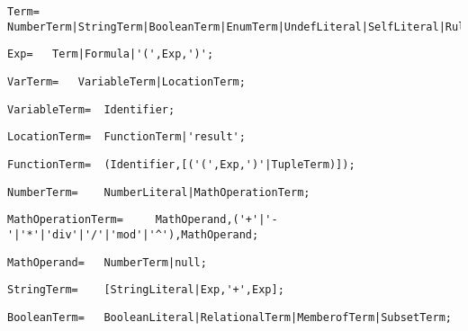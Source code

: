 \documentclass{article}
\begin{document}
    \begin{lstlisting}[mathescape=true]
     Term= 	NumberTerm|StringTerm|BooleanTerm|EnumTerm|UndefLiteral|SelfLiteral|RuleAsTerm|ValueTerm|StructureTerm;
    \end{lstlisting}
    
    \begin{lstlisting}[mathescape=true]
     Exp= 	Term|Formula|'(',Exp,')';
    \end{lstlisting}
    
    \begin{lstlisting}[mathescape=true]
     VarTerm= 	VariableTerm|LocationTerm;
    \end{lstlisting}
    
    \begin{lstlisting}[mathescape=true]
     VariableTerm= 	Identifier;
    \end{lstlisting}
    
    \begin{lstlisting}[mathescape=true]
     LocationTerm= 	FunctionTerm|'result';
    \end{lstlisting}
    
    \begin{lstlisting}[mathescape=true]
     FunctionTerm= 	(Identifier,[('(',Exp,')'|TupleTerm)]);
    \end{lstlisting}
    
    \begin{lstlisting}[mathescape=true]
     NumberTerm= 	NumberLiteral|MathOperationTerm;
    \end{lstlisting}
    
    \begin{lstlisting}[mathescape=true]
     MathOperationTerm= 	MathOperand,('+'|'-'|'*'|'div'|'/'|'mod'|'^'),MathOperand;
    \end{lstlisting}
    
    \begin{lstlisting}[mathescape=true]
     MathOperand= 	NumberTerm|null;
    \end{lstlisting}
    
    \begin{lstlisting}[mathescape=true]
     StringTerm= 	[StringLiteral|Exp,'+',Exp];
    \end{lstlisting}
    
    \begin{lstlisting}[mathescape=true]
     BooleanTerm= 	BooleanLiteral|RelationalTerm|MemberofTerm|SubsetTerm;
    \end{lstlisting}
    
\end{document}
